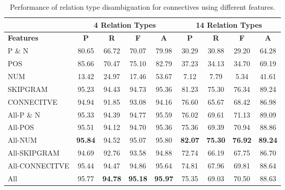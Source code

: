 \begin{table}[ht]
\centering
\begin{tabular}{|l|c|c|c|c|c|c|c|c|}
\hline
                  & \multicolumn{4}{c|}{4 Relation Types}      & \multicolumn{4}{c|}{14 Relation Types}                                    \\ \hline
\bf Features      & \bf P         & \bf R      & \bf F         & \bf A         & \bf P         & \bf R      & \bf F        & \bf A         \\ \hline
    P \& N        &     80.65     &     66.72  &     70.07     &     79.98     &     30.29     &     30.88  &     29.20    &     64.28     \\ \hline
    POS           &     85.66     &     70.47  &     75.10     &     82.79     &     37.23     &     34.13  &     34.70    &     69.19     \\ \hline
    NUM           &     13.42     &     24.97  &     17.46     &     53.67     &      7.12     &      7.79  &      5.34    &     41.61     \\ \hline
    SKIPGRAM      &     95.23     &     94.43  &     94.73     &     95.36     &     81.23     &     75.30  &     76.34    &     89.24     \\ \hline
    CONNECITVE    &     94.94     &     91.85  &     93.08     &     94.16     &     76.60     &     65.67  &     68.42    &     86.98     \\ \hline
    All-P \& N    &     95.33     &     94.39  &     94.77     &     95.59     &     76.02     &     69.61  &     71.13    &     89.09     \\ \hline
    All-POS       &     95.51     &     94.12  &     94.70     &     95.36     &     75.36     &     69.39  &     70.94    &     88.86     \\ \hline
    All-NUM       & \bf 95.84     &     94.52  &     95.07     &     95.80     & \bf 82.07     & \bf 75.30  & \bf 76.92    & \bf 89.24     \\ \hline
    All-SKIPGRAM  &     94.69     &     92.76  &     93.58     &     94.88     &     72.74     &     66.19  &     67.75    &     86.70     \\ \hline
    All-CONNECITVE&     95.44     &     94.47  &     94.86     &     95.64     &     74.81     &     67.96  &     69.81    &     88.64     \\ \hline
    All           &     95.77     & \bf 94.78  & \bf 95.18     & \bf 95.97     &     75.35     &     69.03  &     70.50    &     88.63     \\ \hline

\end{tabular}
\caption{\label{t:sense-features} Performance of relation type
disambiguation for connectives using different features. }
\end{table}

